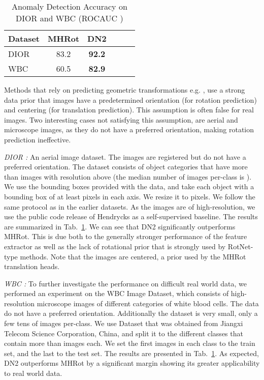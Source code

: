 \documentclass{article}
\begin{document}
\begin{table}
  \centering
  \caption{Anomaly Detection Accuracy on DIOR and WBC (ROCAUC )}
 

    \begin{tabular}{lcclcc}
     \toprule      

      Dataset & MHRot & DN2 \\
      \midrule
      DIOR & 83.2 & \textbf{92.2} \\
      WBC & 60.5 & \textbf{82.9}\\
\bottomrule
    \end{tabular}
     \label{tab:exp_inv}
\end{table}

Methods that rely on predicting geometric transformations e.g. \cite{golan2018deep, hendrycks2019using, bergman2020classification}, use a strong data prior that images have a predetermined orientation (for rotation prediction) and centering (for translation prediction). This assumption is often false for real images. Two interesting cases not satisfying this assumption, are aerial and microscope images, as they do not have a preferred orientation, making rotation prediction ineffective.

\textit{DIOR \cite{li2020object}:} An aerial image dataset. The images are registered but do not have a preferred orientation. The dataset consists of  object categories that have more than  images with resolution above  (the median number of images per-class is ). We use the bounding boxes provided with the data, and take each object with a bounding box of at least  pixels in each axis. We resize it to  pixels. We follow the same protocol as in the earlier datasets. As the images are of high-resolution, we use the public code release of Hendrycks \cite{hendrycks2018deep} as a self-supervised baseline. The results are summarized in Tab.~\ref{tab:exp_inv}. We can see that DN2 significantly outperforms MHRot. This is due both to the generally stronger performance of the feature extractor as well as the lack of rotational prior that is strongly used by RotNet-type methods. Note that the images are centered, a prior used by the MHRot translation heads.

\textit{WBC \cite{zheng2018fast}:} To further investigate the performance on difficult real world data, we performed an experiment on the WBC Image Dataset, which consists of high-resolution microscope images of different categories of white blood cells. The data do not have a preferred orientation. Additionally the dataset is very small, only a few tens of images per-class. We use Dataset  that was obtained from Jiangxi Telecom Science Corporation, China, and split it to the  different classes that contain more than  images each. We set the first  images in each class to the train set, and the last  to the test set. The results are presented in Tab.~\ref{tab:exp_inv}. As expected, DN2 outperforms MHRot by a significant margin showing its greater applicability to real world data. 
\end{document}
